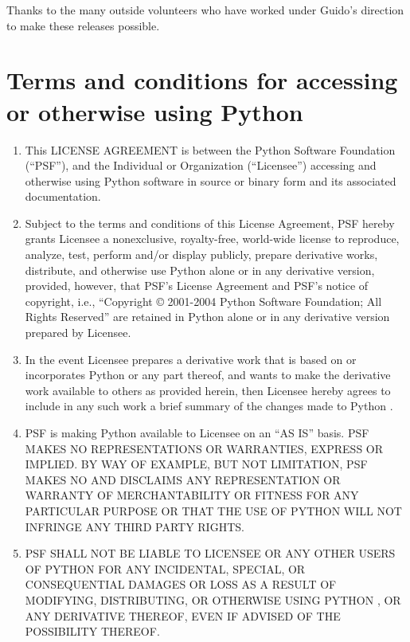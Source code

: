 Thanks to the many outside volunteers who have worked under Guido's
direction to make these releases possible.


\section{Terms and conditions for accessing or otherwise using Python}

\centerline{}

\begin{enumerate}
\item
This LICENSE AGREEMENT is between the Python Software Foundation
(``PSF''), and the Individual or Organization (``Licensee'') accessing
and otherwise using Python \version{} software in source or binary
form and its associated documentation.

\item
Subject to the terms and conditions of this License Agreement, PSF
hereby grants Licensee a nonexclusive, royalty-free, world-wide
license to reproduce, analyze, test, perform and/or display publicly,
prepare derivative works, distribute, and otherwise use Python
\version{} alone or in any derivative version, provided, however, that
PSF's License Agreement and PSF's notice of copyright, i.e.,
``Copyright \copyright{} 2001-2004 Python Software Foundation; All
Rights Reserved'' are retained in Python \version{} alone or in any
derivative version prepared by Licensee.

\item
In the event Licensee prepares a derivative work that is based on
or incorporates Python \version{} or any part thereof, and wants to
make the derivative work available to others as provided herein, then
Licensee hereby agrees to include in any such work a brief summary of
the changes made to Python \version.

\item
PSF is making Python \version{} available to Licensee on an ``AS IS''
basis.  PSF MAKES NO REPRESENTATIONS OR WARRANTIES, EXPRESS OR
IMPLIED.  BY WAY OF EXAMPLE, BUT NOT LIMITATION, PSF MAKES NO AND
DISCLAIMS ANY REPRESENTATION OR WARRANTY OF MERCHANTABILITY OR FITNESS
FOR ANY PARTICULAR PURPOSE OR THAT THE USE OF PYTHON \version{} WILL
NOT INFRINGE ANY THIRD PARTY RIGHTS.

\item
PSF SHALL NOT BE LIABLE TO LICENSEE OR ANY OTHER USERS OF PYTHON
\version{} FOR ANY INCIDENTAL, SPECIAL, OR CONSEQUENTIAL DAMAGES OR
LOSS AS A RESULT OF MODIFYING, DISTRIBUTING, OR OTHERWISE USING PYTHON
\version, OR ANY DERIVATIVE THEREOF, EVEN IF ADVISED OF THE
POSSIBILITY THEREOF.


\end{enumerate}
